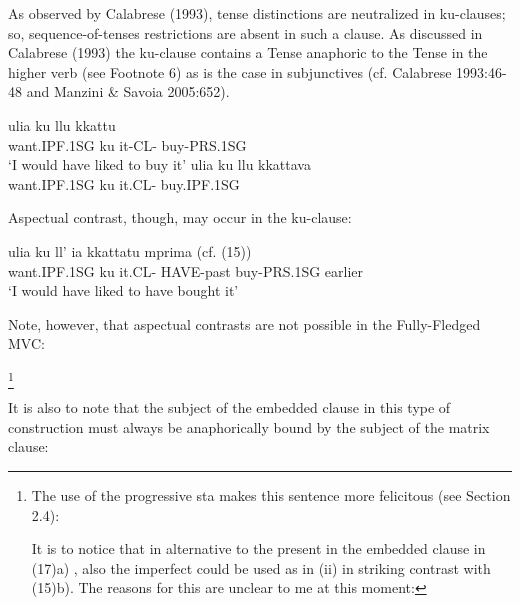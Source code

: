 \documentclass[output=paper,colorlinks,citecolor=brown,
]{langscibook}
\begin{document}
 As observed by Calabrese (1993), tense distinctions are neutralized in ku-clauses; so, sequence-of-tenses restrictions are absent in such a clause.  As discussed in Calabrese (1993) the ku-clause contains a Tense anaphoric to the Tense in the higher verb (see Footnote 6) as is the case in subjunctives (cf. Calabrese 1993:46-48 and Manzini \& Savoia 2005:652).

\ea
    \ea \gll ulia        ku   llu    kkattu \\
     want.IPF.1SG ku   it-CL-  buy-PRS.1SG\\
    \glt ‘I would have liked to buy it’
    \ex \gll *ulia       ku   llu     kkattava \\
     want.IPF.1SG ku   it.CL-  buy.IPF.1SG \\
    \z
\z
     
Aspectual contrast, though, may occur in the ku-clause:

\ea \gll ulia         ku  ll’   ia    kkattatu     mprima  (cf. (15))\\
  want.IPF.1SG ku  it.CL- HAVE-past buy-PRS.1SG earlier\\
 \glt ‘I would have liked to have bought it’
\z

Note, however, that aspectual contrasts are not possible in the Fully-Fledged MVC: 

\footnote{The use of the progressive sta makes this sentence more felicitous (see Section 2.4):

\z

It is to notice that in alternative to the present in the embedded clause in (17)a) , also the imperfect could be used as in (ii) in striking contrast with (15)b). The reasons for this are unclear to me at this moment:

\z
}

\ea
    \z
\z 

It is also to note that the subject of the embedded clause in this type of construction must always be anaphorically bound by the subject of the matrix clause:
\end{document}
